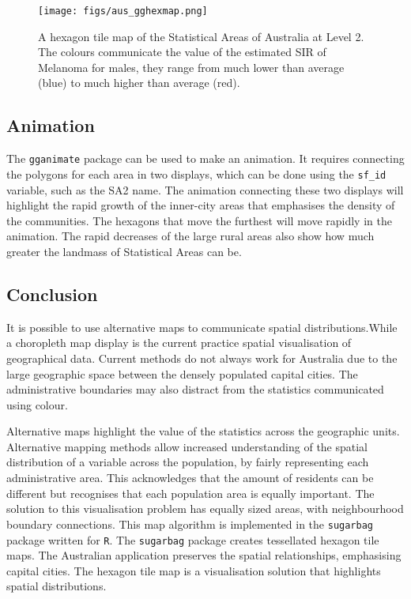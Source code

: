 \begin{figure}[h]
\centering
\texttt{[image: figs/aus\_gghexmap.png]}
\caption{\label{fig:melanoma-geo}A hexagon tile map of the Statistical Areas of Australia at Level 2. The colours communicate the value of the estimated SIR of Melanoma for males, they range from much lower than average (blue) to much higher than average (red).}
\end{figure}

\hypertarget{animation}{%
\subsection{Animation}\label{animation}}

The \texttt{gganimate} \citep{gganimate} package can be used to make an
animation. It requires connecting the polygons for each area in two
displays, which can be done using the \texttt{sf\_id} variable, such as
the SA2 name. The animation connecting these two displays will highlight
the rapid growth of the inner-city areas that emphasises the density of
the communities. The hexagons that move the furthest will move rapidly
in the animation. The rapid decreases of the large rural areas also show
how much greater the landmass of Statistical Areas can be.

\hypertarget{conclusion-03}{%
\subsection{Conclusion}\label{conclusion-03}}

It is possible to use alternative maps to communicate spatial
distributions.While a choropleth map display is the current practice
spatial visualisation of geographical data. Current methods do not
always work for Australia due to the large geographic space between the
densely populated capital cities. The administrative boundaries may also
distract from the statistics communicated using colour.

Alternative maps highlight the value of the statistics across the
geographic units. Alternative mapping methods allow increased
understanding of the spatial distribution of a variable across the
population, by fairly representing each administrative area. This
acknowledges that the amount of residents can be different but
recognises that each population area is equally important. The solution
to this visualisation problem has equally sized areas, with
neighbourhood boundary connections. This map algorithm is implemented in
the \texttt{sugarbag} \citep{sugarbag} package written for \texttt{R}.
The \texttt{sugarbag} package creates tessellated hexagon tile maps. The
Australian application preserves the spatial relationships, emphasising
capital cities. The hexagon tile map is a visualisation solution that
highlights spatial distributions.

